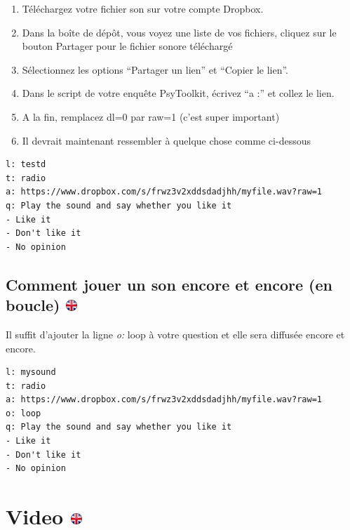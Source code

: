 \documentclass[
]{book}
\providecommand{\tightlist}{%
  \setlength{\itemsep}{0pt}\setlength{\parskip}{0pt}}
\begin{document}
\begin{enumerate}
\def\labelenumi{\arabic{enumi}.}
\tightlist
\item
  Téléchargez votre fichier son sur votre compte Dropbox.
\item
  Dans la boîte de dépôt, vous voyez une liste de vos fichiers, cliquez sur le bouton Partager pour le fichier sonore téléchargé
\item
  Sélectionnez les options ``Partager un lien'' et ``Copier le lien''.
\item
  Dans le script de votre enquête PsyToolkit, écrivez ``a :'' et collez le lien.
\item
  A la fin, remplacez dl=0 par raw=1 (c'est super important)
\item
  Il devrait maintenant ressembler à quelque chose comme ci-dessous
\end{enumerate}

\begin{verbatim}
l: testd
t: radio
a: https://www.dropbox.com/s/frwz3v2xddsdadjhh/myfile.wav?raw=1
q: Play the sound and say whether you like it
- Like it
- Don't like it
- No opinion
\end{verbatim}

\hypertarget{comment-jouer-un-son-encore-et-encore-en-boucle}{%
\subsection[Comment jouer un son encore et encore (en boucle) ]{\texorpdfstring{Comment jouer un son encore et encore (en boucle) \href{https://www.psytoolkit.org/lessons/surveyaudiovideo.html\#_how_to_play_a_sound_again_and_again_loop}{\protect\includegraphics{img/ukflag.png}}}{Comment jouer un son encore et encore (en boucle) }}\label{comment-jouer-un-son-encore-et-encore-en-boucle}}

Il suffit d'ajouter la ligne \emph{o:} loop à votre question et elle sera diffusée encore et encore.

\begin{verbatim}
l: mysound
t: radio
a: https://www.dropbox.com/s/frwz3v2xddsdadjhh/myfile.wav?raw=1
o: loop
q: Play the sound and say whether you like it
- Like it
- Don't like it
- No opinion
\end{verbatim}

\hypertarget{video}{%
\section[Video ]{\texorpdfstring{Video \href{https://www.psytoolkit.org/lessons/surveyaudiovideo.html\#_video}{\protect\includegraphics{img/ukflag.png}}}{Video }}\label{video}}
\end{document}
